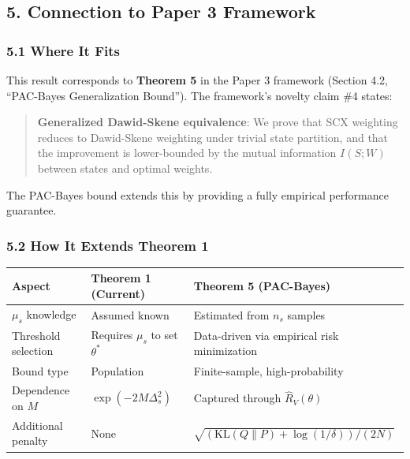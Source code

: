 \documentclass[
  12pt,
]{ctexart}
\begin{document}
\subsection{5. Connection to Paper 3
Framework}\label{connection-to-paper-3-framework}

\subsubsection{5.1 Where It Fits}\label{where-it-fits}

This result corresponds to \textbf{Theorem 5} in the Paper 3 framework
(Section 4.2, ``PAC-Bayes Generalization Bound''). The framework's
novelty claim \#4 states:

\begin{quote}
\textbf{Generalized Dawid-Skene equivalence}: We prove that SCX
weighting reduces to Dawid-Skene weighting under trivial state
partition, and that the improvement is lower-bounded by the mutual
information \(I(S; W)\) between states and optimal weights.
\end{quote}

The PAC-Bayes bound extends this by providing a fully empirical
performance guarantee.

\subsubsection{5.2 How It Extends Theorem
1}\label{how-it-extends-theorem-1}

\begin{longtable}[]{@{}
  >{\raggedright\arraybackslash}p{}
  >{\raggedright\arraybackslash}p{}
  >{\raggedright\arraybackslash}p{}@{}}
\toprule\noalign{}
\begin{minipage}[b]{\linewidth}\raggedright
Aspect
\end{minipage} & \begin{minipage}[b]{\linewidth}\raggedright
Theorem 1 (Current)
\end{minipage} & \begin{minipage}[b]{\linewidth}\raggedright
Theorem 5 (PAC-Bayes)
\end{minipage} \\
\midrule\noalign{}
\endhead
\bottomrule\noalign{}
\endlastfoot
\(\mu_s\) knowledge & Assumed known & Estimated from \(n_s\) samples \\
Threshold selection & Requires \(\mu_s\) to set \(\theta^*\) &
Data-driven via empirical risk minimization \\
Bound type & Population & Finite-sample, high-probability \\
Dependence on \(M\) & \(\exp(-2M\Delta_s^2)\) & Captured through
\(\hat{R}_V(\theta)\) \\
Additional penalty & None &
\(\sqrt{(\text{KL}(Q\|P) + \log(1/\delta)) / (2N)}\) \\
\end{longtable}
\end{document}
